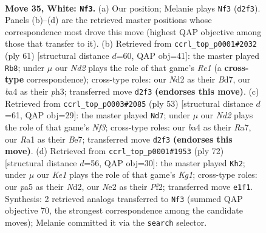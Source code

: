 \documentclass[11pt]{article}
\begin{document}
\clearpage

\begin{figure}[p]\centering
\begin{subfigure}{0.46\textwidth}\centering
\resizebox{\linewidth}{!}{%
\newchessgame
\chessboard[
  setfen={r5k1/b3n3/8/pp2p3/b1p3P1/P1P5/1B1NNP2/R3K3 w - - 6 35},
  showmover=false,
  pgfstyle=straightmove, color=movearrow, markmove={d2-f3}
]}
\caption{}
\end{subfigure}\hfill
\begin{subfigure}{0.46\textwidth}\centering
\resizebox{\linewidth}{!}{%
\newchessgame
\chessboard[
  setfen={4r3/3b1pk1/5n1p/3p2p1/1P4P1/3B1P1P/4N3/3R2K1 b - - 0 31},
  showmover=false,
  pgfstyle=straightmove, color=movearrow, markmove={e8-b8}
]}
\caption{}
\end{subfigure}
\\[4pt]
\begin{subfigure}{0.46\textwidth}\centering
\resizebox{\linewidth}{!}{%
\newchessgame
\chessboard[
  setfen={5k2/r3bp2/3p1n1p/3P2p1/2Bp4/3P2PP/3B1P2/1R4K1 b - - 2 27},
  showmover=false,
  pgfstyle=straightmove, color=movearrow, markmove={f6-d7}
]}
\caption{}
\end{subfigure}\hfill
\begin{subfigure}{0.46\textwidth}\centering
\resizebox{\linewidth}{!}{%
\newchessgame
\chessboard[
  setfen={r4bk1/8/4pn1p/4p1p1/4P3/3RB2P/3N1PP1/6K1 w - - 0 37},
  showmover=false,
  pgfstyle=straightmove, color=movearrow, markmove={g1-h2}
]}
\caption{}
\end{subfigure}
\caption{\textbf{Move 35, White: \texttt{Nf3}.} (a) Our position; Melanie plays \texttt{Nf3} (\texttt{d2f3}). Panels (b)--(d) are the retrieved master positions whose correspondence most drove this move (highest QAP objective among those that transfer to it). (b) Retrieved from \texttt{ccrl\_top\_p0001\#2032} (ply 61) [structural distance $d$=60, QAP obj=41]: the master played \texttt{Rb8}; under $\mu$ our \emph{Nd2} plays the role of that game's \emph{Re1} (a \textbf{cross-type} correspondence); cross-type roles: our \emph{N}d2 as their \emph{B}d7, our \emph{b}a4 as their \emph{p}h3; transferred move \texttt{d2f3} \textbf{(endorses this move)}. (c) Retrieved from \texttt{ccrl\_top\_p0003\#2085} (ply 53) [structural distance $d$=61, QAP obj=29]: the master played \texttt{Nd7}; under $\mu$ our \emph{Nd2} plays the role of that game's \emph{Nf3}; cross-type roles: our \emph{b}a4 as their \emph{R}a7, our \emph{R}a1 as their \emph{B}e7; transferred move \texttt{d2f3} \textbf{(endorses this move)}. (d) Retrieved from \texttt{ccrl\_top\_p0001\#1953} (ply 72) [structural distance $d$=56, QAP obj=30]: the master played \texttt{Kh2}; under $\mu$ our \emph{Ke1} plays the role of that game's \emph{Kg1}; cross-type roles: our \emph{p}a5 as their \emph{N}d2, our \emph{N}e2 as their \emph{P}f2; transferred move \texttt{e1f1}. Synthesis: 2 retrieved analogs transferred to \texttt{Nf3} (summed QAP objective 70, the strongest correspondence among the candidate moves); Melanie committed it via the \texttt{search} selector.}
\label{fig:thought-m68}
\end{figure}
\end{document}
